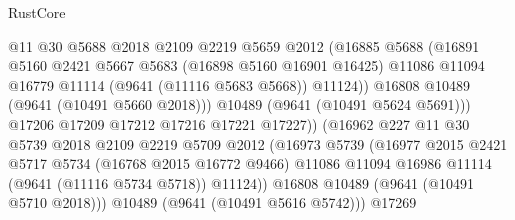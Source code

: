 \begin{lexlean}{RustCore}
\begin{coremodule}
                                  @11
                                  @30
                                  @5688
                                  @2018
                                  @2109
                                  @2219
                                  @5659
                                  @2012
                                  (@16885
                                    @5688
                                    (@16891
                                      @5160
                                      @2421
                                      @5667
                                      @5683
                                      (@16898 @5160 @16901 @16425)
                                      @11086
                                      @11094
                                      @16779
                                      @11114
                                      (@9641 (@11116 @5683 @5668))
                                      @11124))
                                  @16808
                                  @10489
                                  (@9641 (@10491 @5660 @2018)))
                                @10489
                                (@9641 (@10491 @5624 @5691)))
                              @17206
                              @17209
                              @17212
                              @17216
                              @17221
                              @17227))
                          (@16962
                            @227
                            @11
                            @30
                            @5739
                            @2018
                            @2109
                            @2219
                            @5709
                            @2012
                            (@16973
                              @5739
                              (@16977
                                @2015
                                @2421
                                @5717
                                @5734
                                (@16768 @2015 @16772 @9466)
                                @11086
                                @11094
                                @16986
                                @11114
                                (@9641 (@11116 @5734 @5718))
                                @11124))
                            @16808
                            @10489
                            (@9641 (@10491 @5710 @2018)))
                          @10489
                          (@9641 (@10491 @5616 @5742)))
                        @17269

\end{coremodule}
\end{lexlean}
